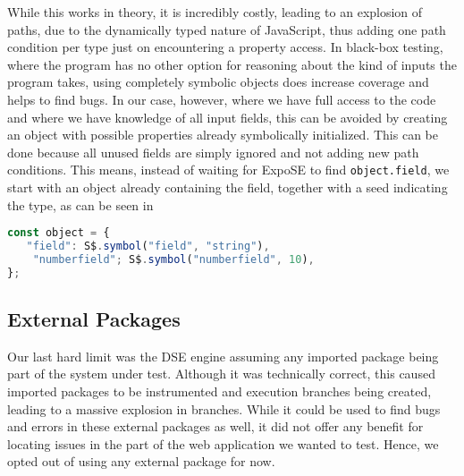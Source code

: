 While this works in theory, it is incredibly costly, leading to an explosion of paths, due to the dynamically typed nature of JavaScript, thus adding one path condition per type just on encountering a property access. In black-box testing, where the program has no other option for reasoning about the kind of inputs the program takes, using completely symbolic objects does increase coverage and helps to find bugs.
In our case, however, where we have full access to the code and where we have knowledge of all input fields, this can be avoided by creating an object with possible properties already symbolically initialized. This can be done because all unused fields are simply ignored and not adding new path conditions. 
This means, instead of waiting for ExpoSE to find \lstinline{object.field}, we start with an object already containing the field, together with a seed indicating the type, as can be seen in 
\begin{lstlisting}[language=JavaScript]
const object = {
   "field": S$.symbol("field", "string"),
    "numberfield"; S$.symbol("numberfield", 10),
};
\end{lstlisting}




\subsection{External Packages}
\label{sec:externalpack}
Our last hard limit was the DSE engine assuming any imported package being part of the system under test. Although it was technically correct, this caused imported packages to be instrumented and execution branches being created, leading to a massive explosion in branches. While it could be used to find bugs and errors in these external packages as well, it did not offer any benefit for locating issues in the part of the web application we wanted to test. 
Hence, we opted out of using any external package for now.

